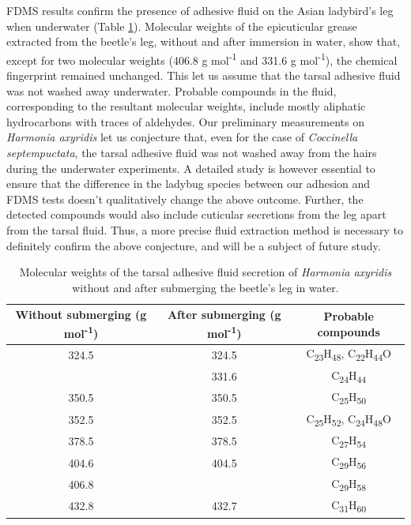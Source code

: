 \documentclass[english]{achemso}
\providecommand{\tabularnewline}{\\}
\begin{document}
FDMS results confirm the presence of adhesive fluid on the Asian ladybird's
leg when underwater (Table \ref{tab:Molecular-distribution-of}).
Molecular weights of the epicuticular grease extracted from the beetle’s leg, without and after immersion in water, show that, except
for two molecular weights (406.8 g mol\protect\textsuperscript{-1} and 331.6 g mol\protect\textsuperscript{-1}), the chemical
fingerprint remained unchanged. This let us assume that the tarsal adhesive fluid
was not washed away underwater. Probable compounds in the fluid, corresponding
to the resultant molecular weights, include mostly aliphatic hydrocarbons
with traces of aldehydes. Our preliminary measurements on \emph{Harmonia axyridis} let us conjecture that, 
even for the case of \emph{Coccinella septempuctata}, the tarsal adhesive fluid was not washed away from the hairs during the underwater experiments. A detailed study is however essential to ensure that the difference in the ladybug species between our adhesion and FDMS tests doesn't qualitatively change the above outcome. Further, the detected compounds would also include cuticular secretions from the leg apart from the tarsal fluid. Thus, a more precise fluid extraction method is necessary to definitely confirm the above conjecture, and will be a subject of future study.

\begin{table}[H]
\centering{}%
\begin{tabular}{|c|c|c|}
\hline 
Without submerging (g mol\protect\textsuperscript{-1}) & After submerging (g mol\protect\textsuperscript{-1}) & Probable compounds\tabularnewline
\hline 
\hline 
324.5 & 324.5 & C\textsubscript{23}H\textsubscript{48}, C\textsubscript{22}H\textsubscript{44}O\tabularnewline
\hline 
 & 331.6 & C\textsubscript{24}H\textsubscript{44}\tabularnewline
\hline 
350.5 & 350.5 & C\textsubscript{25}H\textsubscript{50}\tabularnewline
\hline 
352.5 & 352.5 & C\textsubscript{25}H\textsubscript{52}, C\textsubscript{24}H\textsubscript{48}O\tabularnewline
\hline 
378.5 & 378.5 & C\textsubscript{27}H\textsubscript{54}\tabularnewline
\hline 
404.6 & 404.5 & C\textsubscript{29}H\textsubscript{56}\tabularnewline
\hline 
406.8 &  & C\textsubscript{29}H\textsubscript{58}\tabularnewline
\hline 
432.8 & 432.7 & C\textsubscript{31}H\textsubscript{60}\tabularnewline
\hline 
\end{tabular}\caption{Molecular weights of the tarsal adhesive fluid secretion of \emph{Harmonia axyridis}
without and after submerging the beetle's leg in water. \label{tab:Molecular-distribution-of}}
\end{table}
\end{document}
